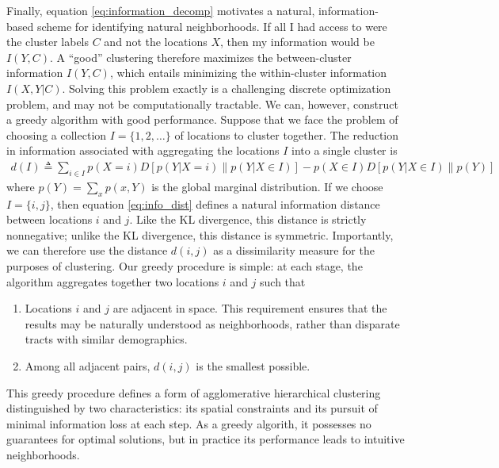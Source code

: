 		Finally, equation \eqref{eq:information_decomp} motivates a natural, information-based scheme for identifying natural neighborhoods. If all I had access to were the cluster labels $C$ and not the locations $X$, then my information would be $I(Y,C)$. A ``good'' clustering therefore maximizes the between-cluster information $I(Y,C)$, which entails minimizing the within-cluster information $I(X,Y|C)$. Solving this problem exactly is a challenging discrete optimization problem, and may not be computationally tractable. We can, however, construct a greedy algorithm with good performance. Suppose that we face the problem of choosing a collection $I = \{1,2,\ldots\}$ of locations to cluster together. The reduction in information associated with aggregating the locations $I$ into a single cluster is 
		\begin{align}
			d(I) \triangleq  \sum_{i \in I} p(X = i)D[p(Y|X = i)\| p(Y|X \in I)] - p(X\in I)D[p(Y|X\in I) \| p(Y)] \label{eq:info_dist}
		\end{align}
		where $p(Y) = \sum_{x} p(x,Y)$ is the global marginal distribution. If we choose $I = \{i,j\}$, then equation \eqref{eq:info_dist} defines a natural information distance between locations $i$ and $j$. Like the KL divergence, this distance is strictly nonnegative; unlike the KL divergence, this distance is symmetric. Importantly, we can therefore use the distance $d(i,j)$ as a dissimilarity measure for the purposes of clustering. Our greedy procedure is simple: at each stage, the algorithm aggregates together two locations $i$ and $j$ such that 
		\begin{enumerate}
			\item Locations $i$ and $j$ are adjacent in space. This requirement ensures that the results may be naturally understood as neighborhoods, rather than disparate tracts with similar demographics.  
			\item Among all adjacent pairs, $d(i,j)$ is the smallest possible. 
		\end{enumerate}
		This greedy procedure defines a form of agglomerative hierarchical clustering distinguished by two characteristics: its spatial constraints and its pursuit of minimal information loss at each step. As a greedy algorith, it possesses no guarantees for optimal solutions, but in practice its performance leads to intuitive neighborhoods. 

	
